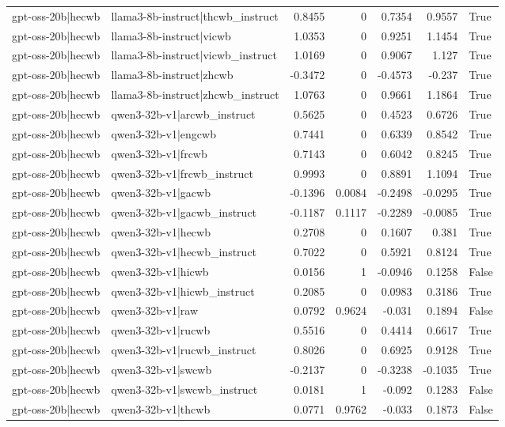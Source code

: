 \begin{table}
\begin{tabular}{l l r r r r l}
gpt-oss-20b|hecwb & llama3-8b-instruct|thcwb_instruct & 0.8455 & 0 & 0.7354 & 0.9557 & True \\
gpt-oss-20b|hecwb & llama3-8b-instruct|vicwb & 1.0353 & 0 & 0.9251 & 1.1454 & True \\
gpt-oss-20b|hecwb & llama3-8b-instruct|vicwb_instruct & 1.0169 & 0 & 0.9067 & 1.127 & True \\
gpt-oss-20b|hecwb & llama3-8b-instruct|zhcwb & -0.3472 & 0 & -0.4573 & -0.237 & True \\
gpt-oss-20b|hecwb & llama3-8b-instruct|zhcwb_instruct & 1.0763 & 0 & 0.9661 & 1.1864 & True \\
gpt-oss-20b|hecwb & qwen3-32b-v1|arcwb_instruct & 0.5625 & 0 & 0.4523 & 0.6726 & True \\
gpt-oss-20b|hecwb & qwen3-32b-v1|engcwb & 0.7441 & 0 & 0.6339 & 0.8542 & True \\
gpt-oss-20b|hecwb & qwen3-32b-v1|frcwb & 0.7143 & 0 & 0.6042 & 0.8245 & True \\
gpt-oss-20b|hecwb & qwen3-32b-v1|frcwb_instruct & 0.9993 & 0 & 0.8891 & 1.1094 & True \\
gpt-oss-20b|hecwb & qwen3-32b-v1|gacwb & -0.1396 & 0.0084 & -0.2498 & -0.0295 & True \\
gpt-oss-20b|hecwb & qwen3-32b-v1|gacwb_instruct & -0.1187 & 0.1117 & -0.2289 & -0.0085 & True \\
gpt-oss-20b|hecwb & qwen3-32b-v1|hecwb & 0.2708 & 0 & 0.1607 & 0.381 & True \\
gpt-oss-20b|hecwb & qwen3-32b-v1|hecwb_instruct & 0.7022 & 0 & 0.5921 & 0.8124 & True \\
gpt-oss-20b|hecwb & qwen3-32b-v1|hicwb & 0.0156 & 1 & -0.0946 & 0.1258 & False \\
gpt-oss-20b|hecwb & qwen3-32b-v1|hicwb_instruct & 0.2085 & 0 & 0.0983 & 0.3186 & True \\
gpt-oss-20b|hecwb & qwen3-32b-v1|raw & 0.0792 & 0.9624 & -0.031 & 0.1894 & False \\
gpt-oss-20b|hecwb & qwen3-32b-v1|rucwb & 0.5516 & 0 & 0.4414 & 0.6617 & True \\
gpt-oss-20b|hecwb & qwen3-32b-v1|rucwb_instruct & 0.8026 & 0 & 0.6925 & 0.9128 & True \\
gpt-oss-20b|hecwb & qwen3-32b-v1|swcwb & -0.2137 & 0 & -0.3238 & -0.1035 & True \\
gpt-oss-20b|hecwb & qwen3-32b-v1|swcwb_instruct & 0.0181 & 1 & -0.092 & 0.1283 & False \\
gpt-oss-20b|hecwb & qwen3-32b-v1|thcwb & 0.0771 & 0.9762 & -0.033 & 0.1873 & False \\

\end{tabular}
\end{table}
